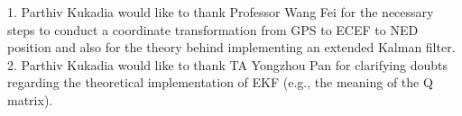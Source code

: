 1. Parthiv Kukadia would like to thank Professor Wang Fei for the necessary steps to conduct a coordinate transformation from GPS to ECEF to NED position and also for the theory behind implementing an extended Kalman filter.\\

2. Parthiv Kukadia would like to thank TA Yongzhou Pan for clarifying doubts regarding the theoretical implementation of EKF (e.g., the meaning of the Q matrix).